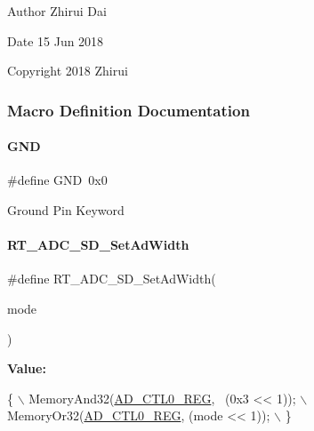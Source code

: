 \begin{DoxyAuthor}{Author}
Zhirui Dai 
\end{DoxyAuthor}
\begin{DoxyDate}{Date}
15 Jun 2018 
\end{DoxyDate}
\begin{DoxyCopyright}{Copyright}
2018 Zhirui 
\end{DoxyCopyright}


\subsubsection{Macro Definition Documentation}
\mbox{\label{a00002_a2c058e9d24bb65c1a6ad2d439b2976ab}} 
\paragraph{\texorpdfstring{G\+ND}{GND}}
{\footnotesize\ttfamily \#define G\+ND~0x0}

Ground Pin Keyword \mbox{\label{a00002_acb989d89893ac99af984979cb9e8df2a}} 
\paragraph{\texorpdfstring{R\+T\+\_\+\+A\+D\+C\+\_\+\+S\+D\+\_\+\+Set\+Ad\+Width}{RT\_ADC\_SD\_SetAdWidth}}
{\footnotesize\ttfamily \#define R\+T\+\_\+\+A\+D\+C\+\_\+\+S\+D\+\_\+\+Set\+Ad\+Width(\begin{DoxyParamCaption}\item[{}]{mode }\end{DoxyParamCaption})}

{\bfseries Value\+:}
\begin{DoxyCode}
\{                                          \(\backslash\)
        MemoryAnd32(\mbox{\hyperlink{a00020_a7c90725a1b307a000a44211bcb115a47}{AD\_CTL0\_REG}}, ~(0x3 << 1)); \(\backslash\)
        MemoryOr32(\mbox{\hyperlink{a00020_a7c90725a1b307a000a44211bcb115a47}{AD\_CTL0\_REG}}, (mode << 1));  \(\backslash\)
    \}
\end{DoxyCode}


